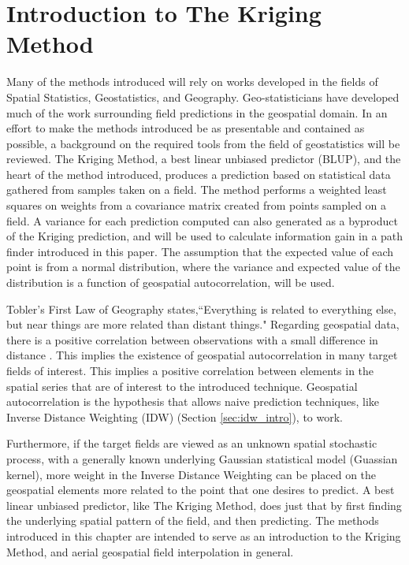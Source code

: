 \chapter{Introduction to The Kriging Method}
Many of the methods introduced will rely on works developed in the fields of Spatial Statistics, Geostatistics, and Geography. Geo-statisticians have developed much of the work surrounding field predictions in the geospatial domain. In an effort to make the methods introduced be as presentable and contained as possible, a background on the required tools from the field of geostatistics will be reviewed. The Kriging Method, a best linear unbiased predictor (BLUP), and the heart of the method introduced, produces a prediction based on statistical data gathered from samples taken on a field. The method performs a weighted least squares on weights from a covariance matrix created from points sampled on a field. A variance for each prediction computed can also generated as a byproduct of the Kriging prediction, and will be used to calculate information gain in a path finder introduced in this paper. The assumption that the expected value of each point is from a normal distribution, where the variance and expected value of the distribution is a function of geospatial autocorrelation, will be used.

Tobler's First Law of Geography \cite{tobler:first_law} states,``Everything is related to everything else, but near things are more related than distant things." Regarding geospatial data, there is a positive correlation between observations with a small difference in distance \cite{miller:on_toblers_first_law}. This implies the existence of geospatial autocorrelation in many target fields of interest. This implies a positive correlation between elements in the spatial series that are of interest to the introduced technique. Geospatial autocorrelation is the hypothesis that allows naive prediction techniques, like Inverse Distance Weighting (IDW) (Section \ref{sec:idw_intro}), to work. 

Furthermore, if the target fields are viewed as an unknown spatial stochastic process, with a generally known underlying Gaussian statistical model (Guassian kernel), more weight in the Inverse Distance Weighting can be placed on the geospatial elements more related to the point that one desires to predict. A best linear unbiased predictor, like The Kriging Method, does just that by first finding the underlying spatial pattern of the field, and then predicting. The methods introduced in this chapter are intended to serve as an introduction to the Kriging Method, and aerial geospatial field interpolation in general.

